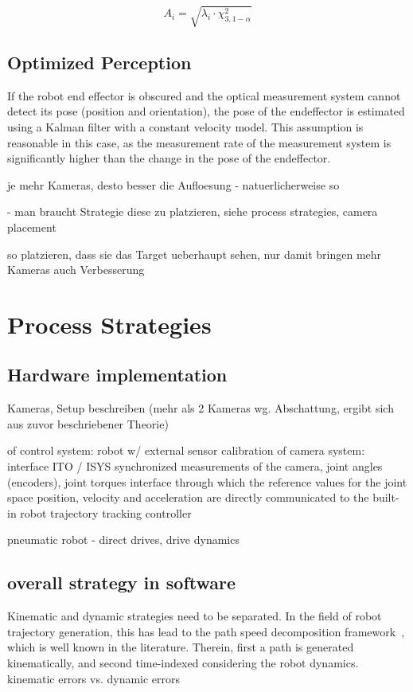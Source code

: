 \documentclass[5p,times,procedia]{elsarticle}
\begin{document}
\begin{equation}
	\label{eqn:LengthEllipsoid}
	A_{i}= \sqrt{\lambda_{i}\cdot \chi^{2}_{3,1-\alpha}}
\end{equation}


\cite{Luhmann2003}



\subsection{Optimized Perception}

If the robot end effector is obscured and the optical measurement system cannot detect its pose (position and orientation), the pose of the endeffector is estimated using a Kalman filter with a constant velocity model. This assumption is reasonable in this case, as the measurement rate of the measurement system is significantly higher than the change in the pose of the endeffector.

je mehr Kameras, desto besser die Aufloesung
- natuerlicherweise so

- man braucht Strategie diese zu platzieren, siehe process strategies, camera placement 

so platzieren, dass sie das Target ueberhaupt sehen, nur damit bringen mehr Kameras auch Verbesserung


\section{Process Strategies}
\subsection{Hardware implementation} 

Kameras, Setup beschreiben (mehr als 2 Kameras wg. Abschattung, ergibt sich aus zuvor beschriebener Theorie)


of control system: robot w/ external sensor
calibration of camera system: interface ITO / ISYS
synchronized measurements of the camera, joint angles (encoders), joint torques 
interface through which the reference values for the joint space position, velocity and acceleration are directly communicated to the built-in robot trajectory tracking controller

pneumatic robot - direct drives, drive dynamics 

\subsection{overall strategy in software}
Kinematic and dynamic strategies need to be separated. 
In the field of robot trajectory generation, this has lead to the path speed decomposition framework~\cite{Choset05}, which is well known in the literature. 
Therein, first a path is generated kinematically, and second time-indexed considering the robot dynamics. 
kinematic errors vs. dynamic errors 
\end{document}
